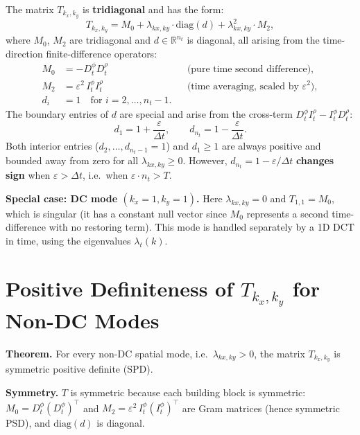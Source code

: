 \documentclass[11pt]{article}
\newcommand{\eps}{\varepsilon}
\newcommand{\dt}{\Delta t}
\newcommand{\RR}{\mathbb{R}}
\newcommand{\lxy}{\lambda_{kx,ky}}
\begin{document}
The matrix $T_{k_x,k_y}$ is \textbf{tridiagonal} and has the form:
\begin{equation}
  T_{k_x,k_y} = M_0 + \lxy \cdot \mathrm{diag}(d) + \lxy^2 \cdot M_2,
\end{equation}
where $M_0$, $M_2$ are tridiagonal and $d \in \RR^{n_t}$ is diagonal, all arising from
the time-direction finite-difference operators:
\begin{align}
  M_0 &= -D_t^{\phi} D_t^{\rho} && \text{(pure time second difference)}, \\
  M_2 &= \eps^2 \, I_t^{\phi} I_t^{\rho} && \text{(time averaging, scaled by } \eps^2 \text{)}, \\
  d_i &= 1 \quad \text{for } i = 2,\ldots,n_t - 1.
\end{align}
The boundary entries of $d$ are special and arise from the cross-term $D_t^{\phi} I_t^{\rho} - I_t^{\phi} D_t^{\rho}$:
\begin{equation}
  \boxed{d_1 = 1 + \frac{\eps}{\dt}, \qquad d_{n_t} = 1 - \frac{\eps}{\dt}.}
\end{equation}
Both interior entries ($d_2, \ldots, d_{n_t-1} = 1$) and $d_1 \geq 1$ are always
positive and bounded away from zero for all $\lxy \geq 0$.
However, $d_{n_t} = 1 - \eps/\dt$ \textbf{changes sign} when $\eps > \dt$, i.e.\
when $\eps \cdot n_t > T$.

\textbf{Special case: DC mode $(k_x = 1, k_y = 1)$.}
Here $\lxy = 0$ and $T_{1,1} = M_0$, which is singular (it has a constant null vector
since $M_0$ represents a second time-difference with no restoring term).
This mode is handled separately by a 1D DCT in time, using the eigenvalues $\lambda_t(k)$.

\section{Positive Definiteness of $T_{k_x,k_y}$ for Non-DC Modes}
\label{sec:pd}

\textbf{Theorem.} For every non-DC spatial mode, i.e.\ $\lxy > 0$, the matrix
$T_{k_x,k_y}$ is symmetric positive definite (SPD).

\medskip
\noindent
\textbf{Symmetry.}
$T$ is symmetric because each building block is symmetric:
$M_0 = D_t^\phi (D_t^\phi)^\top$ and $M_2 = \eps^2\, I_t^\phi (I_t^\phi)^\top$
are Gram matrices (hence symmetric PSD), and $\mathrm{diag}(d)$ is diagonal.
\end{document}
